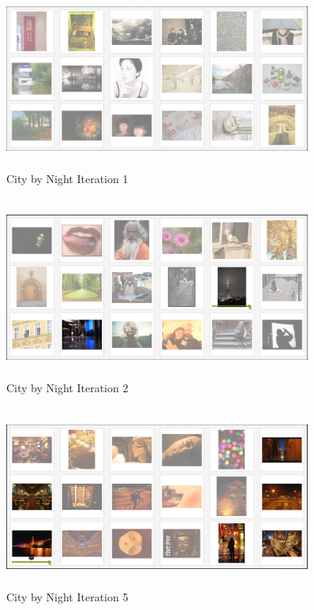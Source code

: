 \documentclass[english]{tktltiki}
\begin{document}
\begin{figure}[!h]
  \centering
    \includegraphics[width=0.90\textwidth,height=6cm]{figures/City_Night_1.png}
    \caption{City by Night Iteration 1}
    \label{city_night_1}
\end{figure}

\begin{figure}[h!]
  \centering
    \includegraphics[width=0.90\textwidth,height=6cm]{figures/City_Night_2.png}
    \caption{City by Night Iteration 2}
    \label{city_night_2}
\end{figure}

\begin{figure}[h!]
  \centering
    \includegraphics[width=0.90\textwidth,height=6cm]{figures/City_Night_5.png}
    \caption{City by Night Iteration 5}
    \label{city_night_5}
\end{figure}
\end{document}
